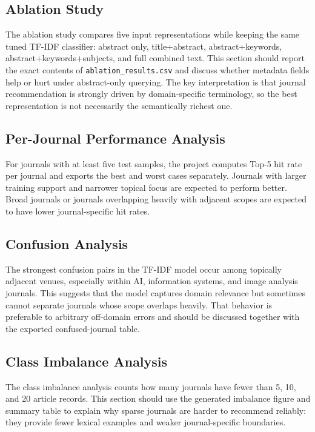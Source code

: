 \documentclass[conference]{IEEEtran}
\begin{document}
\subsection{Ablation Study}
The ablation study compares five input representations while keeping the same tuned TF-IDF classifier: abstract only, title+abstract, abstract+keywords, abstract+keywords+subjects, and full combined text. This section should report the exact contents of \texttt{ablation\_results.csv} and discuss whether metadata fields help or hurt under abstract-only querying. The key interpretation is that journal recommendation is strongly driven by domain-specific terminology, so the best representation is not necessarily the semantically richest one.

\subsection{Per-Journal Performance Analysis}
For journals with at least five test samples, the project computes Top-5 hit rate per journal and exports the best and worst cases separately. Journals with larger training support and narrower topical focus are expected to perform better. Broad journals or journals overlapping heavily with adjacent scopes are expected to have lower journal-specific hit rates.

\subsection{Confusion Analysis}
The strongest confusion pairs in the TF-IDF model occur among topically adjacent venues, especially within AI, information systems, and image analysis journals. This suggests that the model captures domain relevance but sometimes cannot separate journals whose scope overlaps heavily. That behavior is preferable to arbitrary off-domain errors and should be discussed together with the exported confused-journal table.

\subsection{Class Imbalance Analysis}
The class imbalance analysis counts how many journals have fewer than 5, 10, and 20 article records. This section should use the generated imbalance figure and summary table to explain why sparse journals are harder to recommend reliably: they provide fewer lexical examples and weaker journal-specific boundaries.
\end{document}
